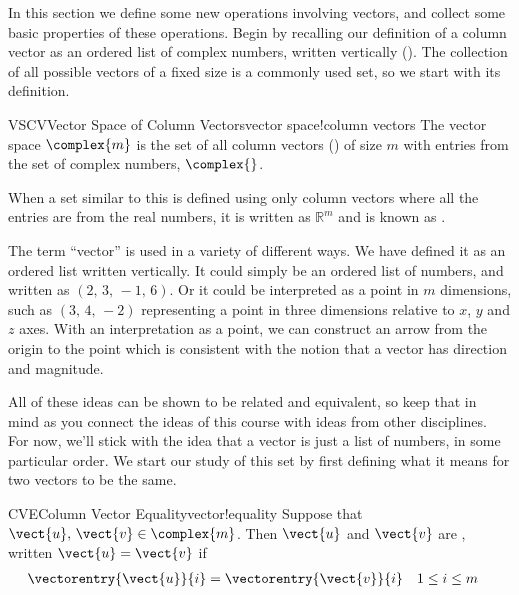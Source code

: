 %
In this section we define some new operations involving vectors, and collect some basic properties of these operations.  Begin by recalling our definition of a column vector as an ordered list of complex numbers, written vertically ().  The collection of all possible vectors of a fixed size is a commonly used set, so we start with its definition.
%
\begin{definition}{VSCV}{Vector Space of Column Vectors}{vector space!column vectors}
The vector space $\complex{m}$ is the set of all column vectors () of size $m$ with entries from the set of complex numbers, $\complex{\null}$.
\end{definition}
%
When a set similar to this is defined using only column vectors where all the entries are from the real numbers, it is written as ${\mathbb R}^m$ and is known as .\par
%
The term ``vector'' is used in a variety of different ways.  We have defined it as an ordered list written vertically.  It could simply be an ordered list of numbers, and written as $\left(2,\,3,\,-1,\,6\right)$.  Or it could be interpreted as a point in $m$ dimensions, such as $\left(3,\,4,\,-2\right)$ representing a point in three dimensions relative to $x$, $y$ and $z$ axes.  With an interpretation as a point, we can construct an arrow from the origin to the point which is consistent with the notion that a vector has direction and magnitude.\par
%
All of these ideas can be shown to be related and equivalent, so keep that in mind as you connect the ideas of this course with ideas from other disciplines.  For now, we'll stick with the idea that a vector is just a list of numbers, in some particular order.
%
%
%
We start our study of this set by first defining what it means for two vectors to be the same.
%
\begin{definition}{CVE}{Column Vector Equality}{vector!equality}
Suppose that $\vect{u},\,\vect{v}\in\complex{m}$.  Then $\vect{u}$ and $\vect{v}$ are , written $\vect{u}=\vect{v}$ if
%
\begin{align*}
\vectorentry{\vect{u}}{i}&=\vectorentry{\vect{v}}{i}
&&1\leq i\leq m
\end{align*}
%
\end{definition}

